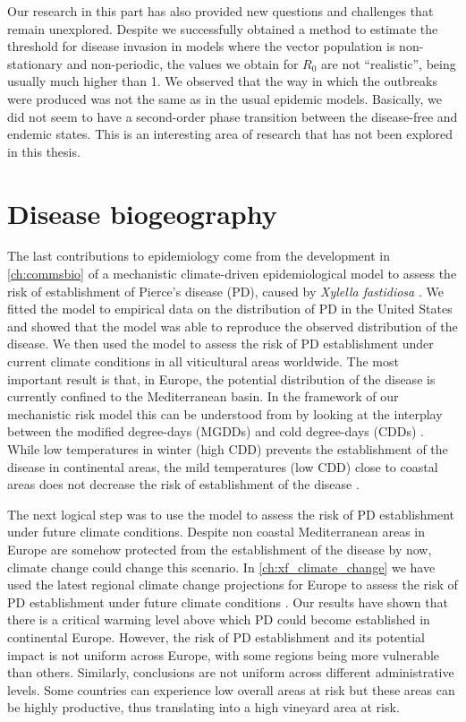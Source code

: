 Our research in this part has also provided new questions and challenges that
remain unexplored. Despite we successfully obtained a method to estimate the
threshold for disease invasion in models where the vector population is
non-stationary and non-periodic, the values we obtain for $R_0$ are not
``realistic'', being usually much higher than 1. We observed that the way in
which the outbreaks were produced was not the same as in the usual epidemic
models. Basically, we did not seem to have a second-order phase transition
between the disease-free and endemic states. This is an interesting area of
research that has not been explored in this thesis.

\section{Disease biogeography}

The last contributions to epidemiology come from the development in
\cref{ch:commsbio} of a mechanistic climate-driven epidemiological model to
assess the risk of establishment of Pierce's disease (PD), caused by
\textit{Xylella fastidiosa} \cite{GimenezRomero2022_CommsBio}. We fitted the
model to empirical data on the distribution of PD in the United States and
showed that the model was able to reproduce the observed distribution of the
disease. We then used the model to assess the risk of PD establishment under
current climate conditions in all viticultural areas worldwide. The most
important result is that, in Europe, the potential distribution of the disease
is currently confined to the Mediterranean basin. In the framework of our
mechanistic risk model this can be understood from by looking at the interplay
between the modified degree-days (MGDDs) and cold degree-days (CDDs)
\cite{GimenezRomero2022_CommsBio}. While low temperatures in winter (high CDD)
prevents the establishment of the disease in continental areas, the mild
temperatures (low CDD) close to coastal areas does not decrease the risk of
establishment of the disease .

The next logical step was to use the model to assess the risk of PD
establishment under future climate conditions. Despite non coastal
Mediterranean areas in Europe are somehow protected from the establishment of
the disease by now, climate change could change this scenario. In
\cref{ch:xf_climate_change} we have used the latest regional climate change
projections for Europe to assess the risk of PD establishment under future
climate conditions \cite{GimenezRomero2023_PD}.
Our results have shown that there is a critical warming level above which PD
could become established in continental Europe. However, the risk of PD
establishment and its potential impact is not uniform across Europe, with some
regions being more vulnerable than others. Similarly, conclusions are not
uniform across different administrative levels. Some countries can experience
low overall areas at risk but these areas can be highly productive, thus
translating into a high vineyard area at risk.

